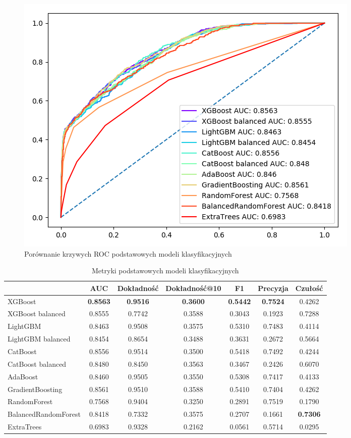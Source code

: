 \documentclass[a4paper,12pt]{article}
\begin{document}
    \begin{figure}[!h]
        \centering
        \includegraphics[width=\textwidth]{../doc/images/roc-comparison.png}
        \caption{Porównanie krzywych ROC podstawowych modeli klasyfikacyjnych}
        \label{fig:roc-comparison}
    \end{figure}

    \begin{table}
        \hspace*{-1cm}
        \begin{tabular}{l|*{6}{c}}
            & AUC & Dokładność & Dokładność@10 & F1 & Precyzja & Czułość \\
            \hline
            XGBoost & \textbf{0.8563} & \textbf{0.9516} & \textbf{0.3600} & \textbf{0.5442} & \textbf{0.7524} & 0.4262 \\
            XGBoost balanced & 0.8555 & 0.7742 & 0.3588 & 0.3043 & 0.1923 & 0.7288 \\
            LightGBM & 0.8463 & 0.9508 & 0.3575 & 0.5310 & 0.7483 & 0.4114 \\
            LightGBM balanced & 0.8454 & 0.8654 & 0.3488 & 0.3631 & 0.2672 & 0.5664 \\
            CatBoost & 0.8556 & 0.9514 & 0.3500 & 0.5418 & 0.7492 & 0.4244 \\
            CatBoost balanced & 0.8480 & 0.8450 & 0.3563 & 0.3467 & 0.2426 & 0.6070 \\
            AdaBoost & 0.8460 & 0.9505 & 0.3550 & 0.5308 & 0.7417 & 0.4133 \\
            GradientBoosting & 0.8561 & 0.9510 & 0.3588 & 0.5410 & 0.7404 & 0.4262 \\
            RandomForest & 0.7568 & 0.9404 & 0.3250 & 0.2891 & 0.7519 & 0.1790 \\
            BalancedRandomForest & 0.8418 & 0.7332 & 0.3575 & 0.2707 & 0.1661 & \textbf{0.7306} \\
            ExtraTrees & 0.6983 & 0.9328 & 0.2162 & 0.0561 & 0.5714 & 0.0295 \\
        \end{tabular}
        \hspace*{1cm}
        \caption{Metryki podstawowych modeli klasyfikacyjnych}
        \label{tab:score-comparison}
    \end{table}
\end{document}
